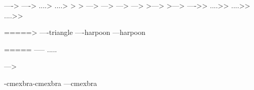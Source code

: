 \iffalse%
\newarrow{To}----{vee}%
\newarrow{Arr}----{LaTeX}%
\newarrow{Dotsto}....{vee}%
\newarrow{Dotsarr}....{LaTeX}%
\newarrow{Dashto}{}{dash}{}{dash}{vee}%
\newarrow{Dasharr}{}{dash}{}{dash}{LaTeX}%
\newarrow{Mapsto}{mapsto}---{vee}%
\newarrow{Mapsarr}{mapsto}---{LaTeX}%
\newarrow{IntoA}{hooka}---{vee}%
\newarrow{IntoB}{hookb}---{vee}%
\newarrow{Embed}{vee}---{vee}%
\newarrow{Emarr}{LaTeX}---{LaTeX}%
\newarrow{Onto}----{doublevee}%
\newarrow{Dotsonarr}....{doubleLaTeX}%
\newarrow{Dotsonto}....{doublevee}%
\newarrow{Dotsonarr}....{doubleLaTeX}%
\else%
---->%
---->%
....>%
....>%
>%
>%
--->%
--->%
--->%
--->%
>--->%
>--->%
----{>>}%
....{>>}%
....{>>}%
....{>>}%
\fi%

===={=>}%
----{triangle}%
----{harpoon}%
---{harpoon}%

=====%
-----%
.....%

--->

{}%
-{cmexbra}-{cmexbra}%
---{cmexbra}%
\def\rightBrace{\d@brace[thick,cmex]}%
\def\leftBrace{\u@brace[thick,cmex]}%
\def\upperBrace{\r@brace[thick,cmex]}%
\def\lowerBrace{\l@brace[thick,cmex]}%
\def\rightParenth{\d@parenth[thick,cmex]}%
\def\leftParenth{\u@parenth[thick,cmex]}%
\def\upperParenth{\r@parenth[thick,cmex]}%
\def\lowerParenth{\l@parenth[thick,cmex]}%

